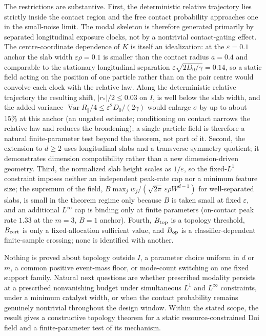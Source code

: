 \documentclass[aps,physrev,reprint,amsmath,amssymb,longbibliography,floatfix]{revtex4-2}
\begin{document}
The restrictions are substantive.  First, the deterministic relative
trajectory lies strictly inside the contact region and the free contact
probability approaches one in the small-noise limit.  The modal skeleton is
therefore generated primarily by separated longitudinal exposure clocks, not
by a nontrivial contact-gating effect.
The centre-coordinate dependence of \(K\) is itself an idealization: at the
\(\varepsilon=0.1\) anchor the slab width \(\varepsilon\rho=0.1\) is smaller
than the contact radius \(a=0.4\) and comparable to the stationary
longitudinal separation \(\varepsilon\sqrt{2D_0/\gamma}=0.14\), so a static
field acting on the position of one particle rather than on the pair centre
would convolve each clock with the relative law.  Along the deterministic
relative trajectory the resulting shift, \(|r_*|/2\le0.03\) on \(I\), is
well below the slab width, and the added variance
\(\operatorname{Var}R_{\parallel}/4\le\varepsilon^2D_0/(2\gamma)\) would
enlarge \(\sigma\) by up to about \(15\%\) at this anchor (an ungated
estimate; conditioning on contact narrows the relative law and reduces the
broadening); a single-particle field
is therefore a natural finite-parameter test beyond the theorem, not part of
it.
Second, the extension to \(d\ge2\)
uses longitudinal slabs and a transverse symmetry quotient; it demonstrates
dimension compatibility rather than a new dimension-driven geometry.
Third, the normalized slab height scales as \(1/\varepsilon\), so the
fixed-\(L^1\) constraint imposes neither an independent peak-rate cap nor a
minimum feature size; the supremum of the field,
\(B\max_jw_j/(\sqrt{2\pi}\,\varepsilon\rho W^{d-1})\) for well-separated
slabs, is small in the theorem regime only because \(B\) is taken small at
fixed \(\varepsilon\), and an additional \(L^\infty\) cap is binding only at
finite parameters (on-contact peak rate \(1.33\) at the \(m=3\), \(B=1\)
anchor).  Fourth, \(B_{\rm top}\) is a topology threshold,
\(B_{\rm cert}\) is only a fixed-allocation sufficient value, and
\(B_{\rm op}\) is a classifier-dependent finite-sample crossing; none is
identified with another.

Nothing is proved about topology outside \(I\), a parameter choice uniform in
\(d\) or \(m\), a common positive event-mass floor, or mode-count switching on
one fixed support family.  Natural next questions are whether prescribed
modality persists at a prescribed nonvanishing budget under simultaneous
\(L^1\) and \(L^\infty\) constraints, under a minimum catalyst width, or when the contact probability remains
genuinely nontrivial throughout the design window.  Within the stated scope,
the result gives a constructive topology theorem for a static
resource-constrained Doi field and a finite-parameter test of its mechanism.
\end{document}

